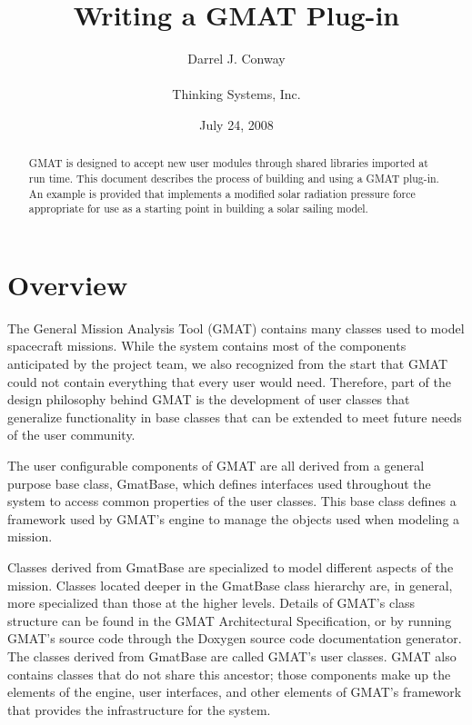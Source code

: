 \documentclass[letterpaper,10pt]{article}
\title{Writing a GMAT Plug-in}
\author{Darrel J. Conway\\\begin{small}Thinking Systems, Inc.\end{small}}
\date{July 24, 2008}
\begin{document}
\maketitle

\begin{abstract}
GMAT is designed to accept new user modules through shared libraries imported at run time.  This
document describes the process of building and using a GMAT plug-in.  An example is provided that
implements a modified solar radiation pressure force appropriate for use as a starting point in
building a solar sailing model.
\end{abstract}

\tableofcontents

\section{Overview}

The General Mission Analysis Tool (GMAT) contains many classes used to model spacecraft missions.
While the system contains most of the components anticipated by the project team, we also
recognized from the start that GMAT could not contain everything that every user would need.
Therefore, part of the design philosophy behind GMAT is the development of user classes that
generalize functionality in base classes that can be extended to meet future needs of the user
community.

The user configurable components of GMAT are all derived from a general purpose base class,
GmatBase, which defines interfaces used throughout the system to access common properties of the
user classes.  This base class defines a framework used by GMAT's engine to manage the objects used
when modeling a mission.

Classes derived from GmatBase are specialized to model different aspects of the mission.  Classes
located deeper in the GmatBase class hierarchy are, in general, more specialized than those at the
higher levels.  Details of GMAT's class structure can be found in the GMAT Architectural
Specification\cite{ArchSpec}, or by running GMAT's source code through the Doxygen source code
documentation generator\cite{Doxygen}.  The classes derived from GmatBase are called GMAT's user
classes.  GMAT also contains classes that do not share this ancestor; those components make up the
elements of the engine, user interfaces, and other elements of GMAT's framework that provides the
infrastructure for the system.
\end{document}
